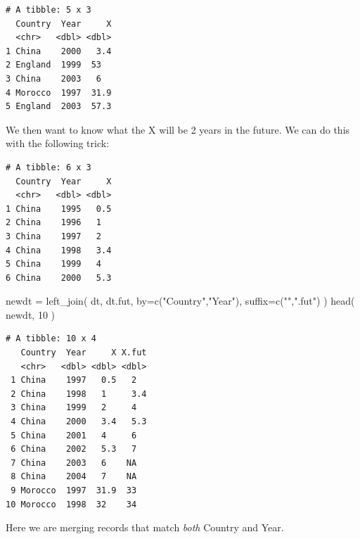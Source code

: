 \documentclass[
  letterpaper,
  DIV=11,
  numbers=noendperiod]{scrreprt}
\newenvironment{Shaded}{\begin{snugshade}}{\end{snugshade}}
\newcommand{\AttributeTok}[1]{\textcolor[rgb]{0.49,0.56,0.16}{#1}}
\newcommand{\DecValTok}[1]{\textcolor[rgb]{0.25,0.63,0.44}{#1}}
\newcommand{\FunctionTok}[1]{\textcolor[rgb]{0.02,0.16,0.49}{#1}}
\newcommand{\NormalTok}[1]{\textcolor[rgb]{0.00,0.44,0.13}{#1}}
\newcommand{\OtherTok}[1]{\textcolor[rgb]{0.00,0.44,0.13}{#1}}
\newcommand{\SpecialCharTok}[1]{\textcolor[rgb]{0.25,0.44,0.63}{#1}}
\newcommand{\StringTok}[1]{\textcolor[rgb]{0.25,0.44,0.63}{#1}}
\begin{document}
\begin{verbatim}
# A tibble: 5 x 3
  Country  Year     X
  <chr>   <dbl> <dbl>
1 China    2000   3.4
2 England  1999  53  
3 China    2003   6  
4 Morocco  1997  31.9
5 England  2003  57.3
\end{verbatim}

We then want to know what the X will be 2 years in the future. We can do
this with the following trick:

\begin{Shaded}
\end{Shaded}

\begin{verbatim}
# A tibble: 6 x 3
  Country  Year     X
  <chr>   <dbl> <dbl>
1 China    1995   0.5
2 China    1996   1  
3 China    1997   2  
4 China    1998   3.4
5 China    1999   4  
6 China    2000   5.3
\end{verbatim}

\begin{Shaded}
\begin{Highlighting}[]
\NormalTok{newdt }\OtherTok{=} \FunctionTok{left\_join}\NormalTok{( dt, dt.fut, }
                   \AttributeTok{by=}\FunctionTok{c}\NormalTok{(}\StringTok{"Country"}\NormalTok{,}\StringTok{"Year"}\NormalTok{), }\AttributeTok{suffix=}\FunctionTok{c}\NormalTok{(}\StringTok{""}\NormalTok{,}\StringTok{".fut"}\NormalTok{) )}
\FunctionTok{head}\NormalTok{( newdt, }\DecValTok{10}\NormalTok{ )}
\end{Highlighting}
\end{Shaded}

\begin{verbatim}
# A tibble: 10 x 4
   Country  Year     X X.fut
   <chr>   <dbl> <dbl> <dbl>
 1 China    1997   0.5   2  
 2 China    1998   1     3.4
 3 China    1999   2     4  
 4 China    2000   3.4   5.3
 5 China    2001   4     6  
 6 China    2002   5.3   7  
 7 China    2003   6    NA  
 8 China    2004   7    NA  
 9 Morocco  1997  31.9  33  
10 Morocco  1998  32    34  
\end{verbatim}

Here we are merging records that match \emph{both} Country and Year.
\end{document}
